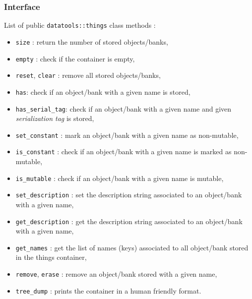 \subsubsection{Interface}

\pn List of public \texttt{datatools::things} class methods :
\begin{itemize}

\item \texttt{size} : return the number of stored objects/banks,

\item \texttt{empty} : check if the container is empty,

\item   \texttt{reset},    \texttt{clear}   :   remove    all   stored
  objects/banks,

\item \texttt{has}: check if an object/bank with a given name is stored,

\item \texttt{has\_serial\_tag}:
  check if an object/bank with a given name and given \emph{serialization tag}
  is stored,

\item \texttt{set\_constant}  : mark an object/bank with  a given name as
  non-mutable,

\item \texttt{is\_constant}  : check if an object/bank  with a given name
  is marked as non-mutable,

\item \texttt{is\_mutable} : check if an object/bank with a given name is
  mutable,

\item   \texttt{set\_description}  :   set   the  description   string
  associated to an object/bank with a given name,

\item   \texttt{get\_description}  :   get   the  description   string
  associated to an object/bank with a given name,

\item \texttt{get\_names} : get the list of names (keys) associated to
  all object/bank stored in the things container,

\item \texttt{remove},  \texttt{erase} : remove  an object/bank stored
  with a given name,

\item \texttt{tree\_dump} : prints the container in a human friendly format.

\end{itemize}

